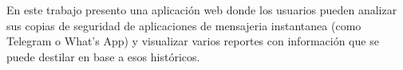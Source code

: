 En este trabajo presento una aplicación web donde los usuarios pueden analizar sus copias de seguridad de aplicaciones de mensajeria instantanea (como Telegram o What's App) y visualizar varios reportes con información que se puede destilar en base a esos históricos.